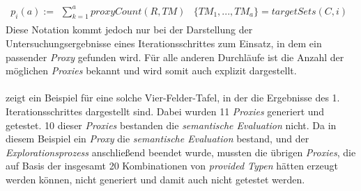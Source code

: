 \begin{gather*}
p_i(a) := \begin{array}{l|l}
\sum_{k=1}^{a}\mathit{proxyCount(R,TM)} & \{\mathit{TM_1},...,\mathit{TM_a}\} = \mathit{targetSets(C,i)}  
\end{array}
\end{gather*}
\noindent
Diese Notation kommt jedoch nur bei der Darstellung der Untersuchungsergebnisse eines Iterationsschrittes zum Einsatz, in dem ein passender \emph{Proxy} gefunden wird. Für alle anderen Durchläufe ist die Anzahl der möglichen \emph{Proxies} bekannt und wird somit auch explizit dargestellt. 
\\\\
 zeigt ein Beispiel für eine solche Vier-Felder-Tafel, in der die Ergebnisse des 1. Iterationsschrittes dargestellt sind. Dabei wurden 11 \emph{Proxies} generiert und getestet. 10 dieser \emph{Proxies} bestanden die \emph{semantische Evaluation} nicht. Da in diesem Beispiel ein \emph{Proxy} die \emph{semantische Evaluation} bestand, und der \emph{Explorationsprozess} anschließend beendet wurde, mussten die übrigen \emph{Proxies}, die auf Basis der insgesamt 20 Kombinationen von \emph{provided Typen} hätten erzeugt werden können, nicht generiert und damit auch nicht getestet werden.


